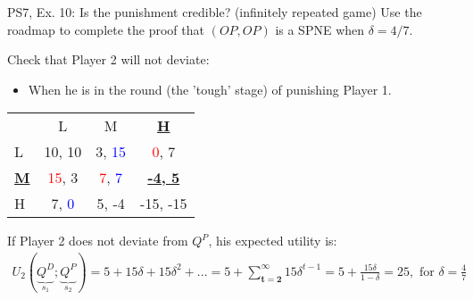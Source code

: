 \begin{frame}{PS7, Ex. 10: Is the punishment credible? (infinitely repeated game)}
    Use the roadmap to complete the proof that $(OP,OP)$ is a SPNE when $\delta=4/7$.\vspace{-4pt}
    \begin{multicols}{2}
      Check that Player 2 will not deviate:
      \begin{itemize}
        \item[4.] When he is in the  round (the 'tough' stage) of punishing Player 1.
      \end{itemize}
      \vfill\null\columnbreak
      \vspace{-6pt}
      \begin{table}
        \begin{tabular}{l|c|c|c|}
          \multicolumn{1}{c}{} & \multicolumn{1}{c}{L} & \multicolumn{1}{c}{M} & \multicolumn{1}{c}{\textbf{\underline{H}}} \\\cline{2-4}
          L & 10, 10 & 3, \textcolor{blue}{15} & \textcolor{red}{0}, 7 \\\cline{2-4}
          \textbf{\underline{M}} & \textcolor{red}{15}, 3 & \textcolor{red}{7}, \textcolor{blue}{7} & \textbf{\underline{-4, 5}} \\\cline{2-4}
          H & 7, \textcolor{blue}{0} & 5, -4 & -15, -15 \\\cline{2-4}
        \end{tabular}
      \end{table}
    \end{multicols}
    \vspace{-20pt}
    If Player 2 does not deviate from $Q^P$, his expected utility is:
    \vspace{-6pt}
    \begin{align*}
      U_2(\underbrace{Q^D}_{s_1};\underbrace{Q^P}_{s_2})=5+15\delta+15\delta^2+...
                  =5+\sum_{\bm{t=2}}^\infty15\delta^{t-1}
                  =5+\frac{15\delta}{1-\delta}
                  =25,\text{ for }\delta=\frac{4}{7}
    \end{align*}
    \vfill\null
\end{frame}
